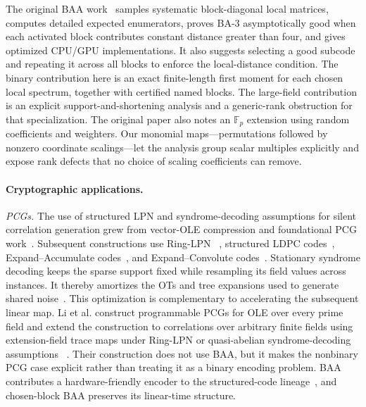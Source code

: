 \documentclass[runningheads,envcountsame,envcountsect]{llncs}
\newcommand{\F}{\mathbb F}
\begin{document}
The original BAA work~\cite{baa26} samples systematic block-diagonal local
matrices, computes detailed expected enumerators, proves BA-3 asymptotically
good when each activated block contributes constant distance greater than four,
and gives optimized CPU/GPU implementations.  It also suggests selecting a
good subcode and repeating it across all blocks to enforce the local-distance
condition.  The binary contribution here is an exact finite-length first
moment for each chosen local spectrum, together with certified named blocks.
The large-field contribution is an explicit support-and-shortening analysis
and a generic-rank obstruction for that specialization.  The original paper
also notes an $\F_p$ extension using random coefficients and weighters.  Our
monomial maps---permutations followed by nonzero coordinate scalings---let the
analysis group scalar multiples explicitly and expose rank defects that no
choice of scaling coefficients can remove.

\paragraph{Cryptographic applications.}
\emph{PCGs.}
The use of structured LPN and syndrome-decoding assumptions for silent
correlation generation grew from vector-OLE compression and foundational PCG
work~\cite{bcgi18,bcg19pcg}.  Subsequent constructions use Ring-LPN
~\cite{bcg20ring}, structured LDPC codes~\cite{silver21},
Expand--Accumulate codes~\cite{ea22}, and Expand--Convolute codes~\cite{ec23}.
Stationary syndrome decoding keeps the sparse support fixed while resampling
its field values across instances.  It thereby amortizes the OTs and tree
expansions used to generate shared noise~\cite{stationary25}.  This optimization
is complementary to accelerating the subsequent linear map.  Li et al.
construct programmable PCGs for OLE over every prime field and extend the
construction to correlations over arbitrary finite fields using extension-field
trace maps under Ring-LPN or quasi-abelian syndrome-decoding assumptions
~\cite{lxyy25}.  Their construction does not use BAA, but it makes the
nonbinary PCG case explicit rather than treating it as a binary encoding
problem.  BAA contributes a hardware-friendly encoder to the structured-code
lineage~\cite{baa26}, and chosen-block BAA preserves its linear-time structure.
\end{document}
